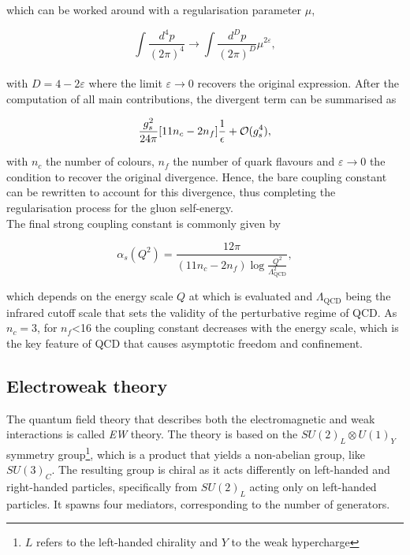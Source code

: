 which can be worked around with a regularisation parameter $\mu$,

\begin{equation*}
    \int \frac{d^4p}{(2\pi)^4}\to \int \frac{d^Dp}{(2\pi)^D}\mu^{2\varepsilon},
\end{equation*}\\

with $D=4-2\varepsilon$ where the limit $\varepsilon\to 0$ recovers the original expression. After the computation of all main contributions, the divergent term can be summarised as

\begin{equation}
    \frac{g_s^2}{24\pi}\qty[11n_c-2 n_f]\frac{1}{\epsilon}+\mathcal{O}(g_s^4),
\end{equation}

with $n_c$ the number of colours, $n_f$ the number of quark flavours and $\varepsilon\to 0$ the condition to recover the original divergence. Hence, the bare coupling constant can be rewritten to account for this divergence, thus completing the regularisation process for the gluon self-energy.\\

The final strong coupling constant is commonly given by 

\begin{equation}
    \label{Theory_eq:runningcoupling}
    \alpha_s(Q^2) = \frac{12\pi}{(11n_c - 2 n_f)\log \frac{Q^2}{\Lambda^2_\text{QCD}}},
\end{equation}

which depends on the energy scale $Q$ at which is evaluated and $\Lambda_\text{QCD}$ being the infrared cutoff scale that sets the validity of the perturbative regime of \acrshort{QCD}. As $n_c=3$, for $n_f$<16 the coupling constant decreases with the energy scale, which is the key feature of \acrshort{QCD} that causes asymptotic freedom and confinement.

\subsection{Electroweak theory}

The quantum field theory that describes both the electromagnetic and weak interactions is called \textit{\acrlong{EW}} theory. The theory is based on the $SU(2)_L\otimes U(1)_Y$ symmetry group\footnote{$L$ refers to the left-handed chirality and $Y$ to the weak hypercharge}, which is a product that yields a non-abelian group, like $SU(3)_C$. The resulting group is chiral as it acts differently on left-handed and right-handed particles, specifically from $SU(2)_L$ acting only on left-handed particles. It spawns four mediators, corresponding to the number of generators.\\

